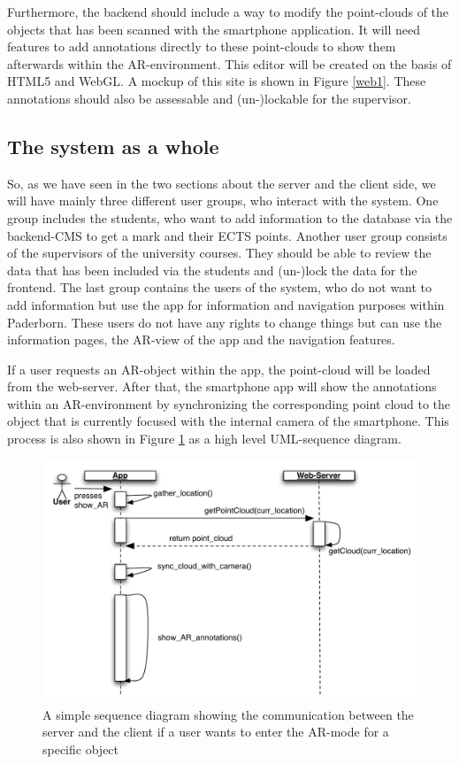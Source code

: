 \documentclass[a4page]{article}
\begin{document}
Furthermore, the backend should include a way to modify the point-clouds of the objects that has been scanned with the smartphone application. It will need features to add annotations directly to these point-clouds to show them afterwards within the \ac{AR}-environment. This editor will be created on the basis of \ac{HTML5} and \ac{WebGL}. A mockup of this site is shown in Figure \ref{web1}. These annotations should also be assessable and (un-)lockable for the supervisor. 

\subsection{The system as a whole}
So, as we have seen in the two sections about the server and the client side, we will have mainly three different user groups, who interact with the system. One group includes the students, who want to add information to the database via the backend-\ac{CMS} to get a mark and their \ac{ECTS} points. Another user group consists of the supervisors of the university courses. They should be able to review the data that has been included via the students and (un-)lock the data for the frontend. The last group contains the users of the system, who do not want to add information but use the app for information and navigation purposes within Paderborn. These users do not have any rights to change things but can use the information pages, the \ac{AR}-view of the app and the navigation features. 

If a user requests an \ac{AR}-object within the app, the point-cloud will be loaded from the web-server. After that, the smartphone app will show the annotations within an \ac{AR}-environment by synchronizing the corresponding point cloud to the object that is currently focused with the internal camera of the smartphone. This process is also shown in Figure \ref{sdia1} as a high level \ac{UML}-sequence diagram.

\begin{figure}[th]
\centerline{\includegraphics[width=1\textwidth]{gfx/sdia1}}
\caption{A simple sequence diagram showing the communication between the server and the client if a user wants to enter the \ac{AR}-mode for a specific object}
\label{sdia1}
\end{figure}
\end{document}
